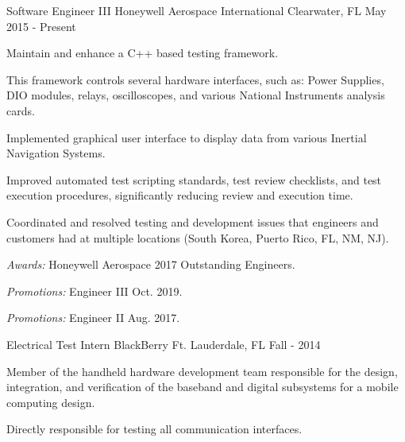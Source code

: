 

\begin{cventries}

  \cventry
    {Software Engineer III} %
    {Honeywell Aerospace International} %
    {Clearwater, FL} %
    {May 2015 - Present} %
    {
      \begin{cvitems} %
        \item {Maintain and enhance a C++ based testing framework.}
				\item {This framework controls several hardware interfaces, such as: Power Supplies, DIO modules, relays, oscilloscopes, and various National Instruments analysis cards.}
        \item {Implemented graphical user interface to display data from various Inertial Navigation Systems.}
				\item {Improved automated test scripting standards, test review checklists, and test execution procedures, significantly reducing review and execution time.}
        \item {Coordinated and resolved testing and development issues that engineers and customers had at multiple locations (South Korea, Puerto Rico, FL, NM, NJ).}
				\item {{\it Awards:} Honeywell Aerospace 2017 Outstanding Engineers.}
				\item {{\it Promotions:} Engineer III Oct. 2019.}
				\item {{\it Promotions:} Engineer II Aug. 2017.}
      \end{cvitems}
    }

	\cventry
		{Electrical Test Intern} %
		{BlackBerry} %
		{Ft. Lauderdale, FL} %
		{Fall - 2014} %
		{
			\begin{cvitems} %
			\item {Member of the handheld hardware development team responsible for the design, integration, and verification of the baseband and digital subsystems for a mobile computing design.}
			\item {Directly responsible for testing all communication interfaces.}
			\end{cvitems}
		}
\end{cventries}
